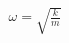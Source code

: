\documentclass[preview]{standalone}
\begin{document}
\begin{align*}
\omega = \sqrt{\frac{k}{m}}
\end{align*}
\end{document}
